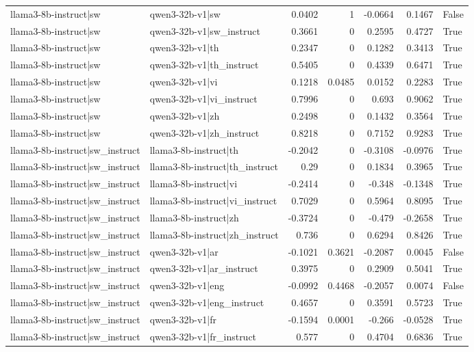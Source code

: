 \begin{table}
\begin{tabular}{l l r r r r l}
llama3-8b-instruct|sw & qwen3-32b-v1|sw & 0.0402 & 1 & -0.0664 & 0.1467 & False \\
llama3-8b-instruct|sw & qwen3-32b-v1|sw_instruct & 0.3661 & 0 & 0.2595 & 0.4727 & True \\
llama3-8b-instruct|sw & qwen3-32b-v1|th & 0.2347 & 0 & 0.1282 & 0.3413 & True \\
llama3-8b-instruct|sw & qwen3-32b-v1|th_instruct & 0.5405 & 0 & 0.4339 & 0.6471 & True \\
llama3-8b-instruct|sw & qwen3-32b-v1|vi & 0.1218 & 0.0485 & 0.0152 & 0.2283 & True \\
llama3-8b-instruct|sw & qwen3-32b-v1|vi_instruct & 0.7996 & 0 & 0.693 & 0.9062 & True \\
llama3-8b-instruct|sw & qwen3-32b-v1|zh & 0.2498 & 0 & 0.1432 & 0.3564 & True \\
llama3-8b-instruct|sw & qwen3-32b-v1|zh_instruct & 0.8218 & 0 & 0.7152 & 0.9283 & True \\
llama3-8b-instruct|sw_instruct & llama3-8b-instruct|th & -0.2042 & 0 & -0.3108 & -0.0976 & True \\
llama3-8b-instruct|sw_instruct & llama3-8b-instruct|th_instruct & 0.29 & 0 & 0.1834 & 0.3965 & True \\
llama3-8b-instruct|sw_instruct & llama3-8b-instruct|vi & -0.2414 & 0 & -0.348 & -0.1348 & True \\
llama3-8b-instruct|sw_instruct & llama3-8b-instruct|vi_instruct & 0.7029 & 0 & 0.5964 & 0.8095 & True \\
llama3-8b-instruct|sw_instruct & llama3-8b-instruct|zh & -0.3724 & 0 & -0.479 & -0.2658 & True \\
llama3-8b-instruct|sw_instruct & llama3-8b-instruct|zh_instruct & 0.736 & 0 & 0.6294 & 0.8426 & True \\
llama3-8b-instruct|sw_instruct & qwen3-32b-v1|ar & -0.1021 & 0.3621 & -0.2087 & 0.0045 & False \\
llama3-8b-instruct|sw_instruct & qwen3-32b-v1|ar_instruct & 0.3975 & 0 & 0.2909 & 0.5041 & True \\
llama3-8b-instruct|sw_instruct & qwen3-32b-v1|eng & -0.0992 & 0.4468 & -0.2057 & 0.0074 & False \\
llama3-8b-instruct|sw_instruct & qwen3-32b-v1|eng_instruct & 0.4657 & 0 & 0.3591 & 0.5723 & True \\
llama3-8b-instruct|sw_instruct & qwen3-32b-v1|fr & -0.1594 & 0.0001 & -0.266 & -0.0528 & True \\
llama3-8b-instruct|sw_instruct & qwen3-32b-v1|fr_instruct & 0.577 & 0 & 0.4704 & 0.6836 & True \\

\end{tabular}
\end{table}
